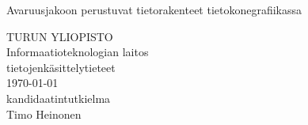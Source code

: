 \begin{titlepage}

 \vspace*{5.0cm}

 \begin{center}\Large
  Avaruusjakoon perustuvat tietorakenteet tietokonegrafiikassa
 \end{center}

\vfill

 \begin{raggedleft}
  TURUN YLIOPISTO\\
  Informaatioteknologian laitos\\
  tietojenkäsittelytieteet\\
  \today\\
  kandidaatintutkielma\\
  Timo Heinonen\\
 \end{raggedleft}

 \begin{figure}[b]
  \vspace*{-5.0cm}
 \end{figure}
\end{titlepage}
